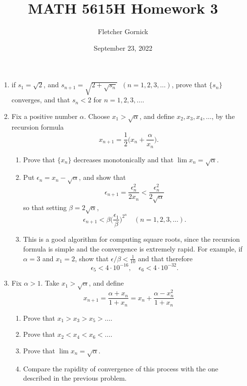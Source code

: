\documentclass[11pt]{article}
\title{\vspace{-1.0cm}MATH 5615H Homework 3}
\author{Fletcher Gornick}
\date{September 23, 2022}
\begin{document}
 \maketitle
 \begin{enumerate}[leftmargin=0pt, label=\arabic*)]
 \item if \(s_1 = \sqrt{2}\), and \(s_{n+1} = \sqrt{2 + \sqrt{s_n}} \;\; (n = 1,2,3,\dots)\),
 prove that \(\{s_n\}\) converges, and that \(s_n < 2\) for \(n = 1, 2, 3, \dots\).
 \newpage

 \item Fix a positive number \(\alpha\).  Choose \(x_1 > \sqrt{\alpha}\), and define 
 \(x_2, x_3, x_4, \dots\), by the recursion formula
 \[x_{n+1} = \frac{1}{2}\bigg(x_n + \frac{\alpha}{x_n}\bigg).\]

 \begin{enumerate}[label=(\alph*)]
   \item Prove that \(\{x_n\}\) decreases monotonically and that \(\lim x_n = \sqrt{\alpha}\).
   \item Put \(\epsilon_n = x_n - \sqrt{\alpha}\), and show that
     \[\epsilon_{n+1} = \frac{\epsilon_n^2}{2x_n} < \frac{\epsilon_n^2}{2\sqrt{\alpha}}\]
     so that setting \(\beta = 2 \sqrt{\alpha}\),
     \[\epsilon_{n+1} < \beta\bigg(\frac{\epsilon_1}{\beta}\bigg)^{2^n} \quad (n = 1, 2, 3, \dots).\]

   \item This is a good algorithm for computing square roots, since the recursion formula is simple and the 
     convergence is extremely rapid.  For example, if \(\alpha = 3\) and \(x_1 = 2\), show that 
     \(\epsilon/\beta < \frac{1}{10}\) and that therefore
     \[\epsilon_5 < 4 \cdot 10^{-16}, \quad \epsilon_6 < 4 \cdot 10^{-32}.\]
 \end{enumerate}
 \newpage

 \item Fix \(\alpha > 1\). Take \(x_1 > \sqrt{\alpha}\), and define
 \[x_{n+1} = \frac{\alpha + x_n}{1 + x_n} = x_n + \frac{\alpha - x_n^2}{1 + x_n}\]

 \begin{enumerate}[label=(\alph*)]
   \item Prove that \(x_1 > x_3 > x_5 > \dots\).
   \item Prove that \(x_2 < x_4 < x_6 < \dots\).
   \item Prove that \(\lim x_n = \sqrt{\alpha}\).
   \item Compare the rapidity of convergence of this process with the one described in the previous problem.
 \end{enumerate}
 \newpage


\end{enumerate}
\end{document}
